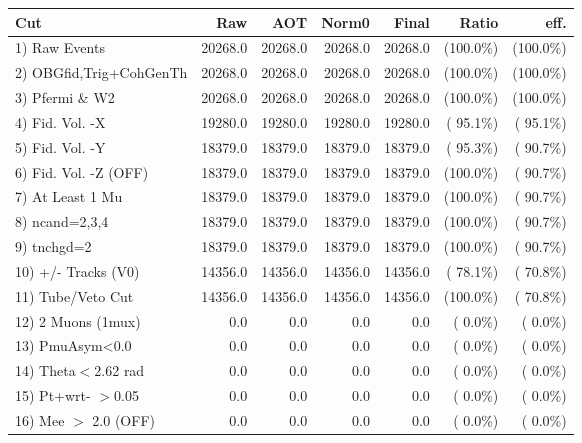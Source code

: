  \begin{table}[h!]\centering
 \begin{tabular}{||l||r|r|r|r|r|r||}
 \hline
 \hline
 Cut & Raw & AOT & Norm0 & Final & Ratio & eff.       \\
 \hline
  1) Raw Events           &      20268.0 &      20268.0 &      20268.0 &      20268.0 & (100.0\%) & (100.0\%) \\
  2) OBGfid,Trig+CohGenTh &      20268.0 &      20268.0 &      20268.0 &      20268.0 & (100.0\%) & (100.0\%) \\
  3) Pfermi \& W2         &      20268.0 &      20268.0 &      20268.0 &      20268.0 & (100.0\%) & (100.0\%) \\
  4) Fid. Vol. -X         &      19280.0 &      19280.0 &      19280.0 &      19280.0 & ( 95.1\%) & ( 95.1\%) \\
  5) Fid. Vol. -Y         &      18379.0 &      18379.0 &      18379.0 &      18379.0 & ( 95.3\%) & ( 90.7\%) \\
  6) Fid. Vol. -Z (OFF)   &      18379.0 &      18379.0 &      18379.0 &      18379.0 & (100.0\%) & ( 90.7\%) \\
  7) At Least 1 Mu        &      18379.0 &      18379.0 &      18379.0 &      18379.0 & (100.0\%) & ( 90.7\%) \\
  8) ncand=2,3,4          &      18379.0 &      18379.0 &      18379.0 &      18379.0 & (100.0\%) & ( 90.7\%) \\
  9) tnchgd=2             &      18379.0 &      18379.0 &      18379.0 &      18379.0 & (100.0\%) & ( 90.7\%) \\
 10) +/- Tracks (V0)      &      14356.0 &      14356.0 &      14356.0 &      14356.0 & ( 78.1\%) & ( 70.8\%) \\
 11) Tube/Veto Cut        &      14356.0 &      14356.0 &      14356.0 &      14356.0 & (100.0\%) & ( 70.8\%) \\
 12) 2 Muons (1mux)       &          0.0 &          0.0 &          0.0 &          0.0 & (  0.0\%) & (  0.0\%) \\
 13) PmuAsym<0.0          &          0.0 &          0.0 &          0.0 &          0.0 & (  0.0\%) & (  0.0\%) \\
 14) Theta$<$2.62 rad     &          0.0 &          0.0 &          0.0 &          0.0 & (  0.0\%) & (  0.0\%) \\
 15) Pt+wrt- $>$0.05      &          0.0 &          0.0 &          0.0 &          0.0 & (  0.0\%) & (  0.0\%) \\
 16) Mee $>$ 2.0  (OFF)   &          0.0 &          0.0 &          0.0 &          0.0 & (  0.0\%) & (  0.0\%) \\

\end{tabular}
\end{table}
